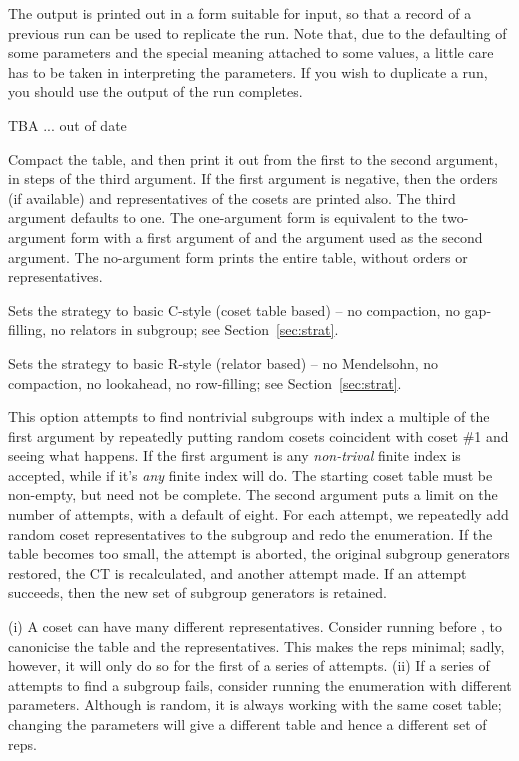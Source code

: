 The output is printed out in a form suitable for input, so that a record
  of a previous run can be used to replicate the run.
Note that, due to the defaulting of some parameters and the special
  meaning attached to some values, a little care has to be taken in
  interpreting the parameters.
If you wish to  duplicate a run, you should use the output
  of   the run completes.

\quad{}  TBA ... out of date

Compact the table, and then print it out from the first to the second
  argument, in steps of the third argument.
If the first argument is negative, then the orders (if available) and
  representatives of the cosets are printed also.
The third argument defaults to one.
The one-argument form is equivalent to the two-argument form with a first
  argument of  and the argument used as the second argument.
The no-argument form prints the entire table, without orders or
  representatives.

\quad{}

Sets the strategy to basic C-style (coset table based) -- 
  no compaction, no gap-filling, no relators in subgroup; 
  see Section~\ref{sec:strat}.

\quad{}

Sets the strategy to basic R-style (relator based) -- 
  no Mendelsohn, no compaction, no lookahead, no row-filling;
  see Section~\ref{sec:strat}.

\quad{}

This option attempts to find nontrivial subgroups with index a multiple
  of the first argument by repeatedly putting random cosets coincident
  with coset \#1 and seeing what happens.
If the first argument is  any \emph{non-trival} finite index is
  accepted, while if it's  \emph{any} finite index will do.
The starting coset table must be non-empty, but need not be complete.
The second argument puts a limit on the number of attempts, with a default
  of eight.
For each attempt, we repeatedly add random coset representatives to the 
  subgroup and redo the enumeration.
If the table becomes too small, the attempt is aborted, the original 
  subgroup generators restored, the CT is recalculated, and another attempt
  made.
If an attempt succeeds, then the new set of subgroup generators is
  retained.

(i)
A coset can have many different representatives.
Consider running  before , to canonicise the table and the
  representatives.
This makes the reps minimal; sadly, however, it will only do so for the
  first of a series of attempts.
(ii)
If a series of attempts to find a subgroup fails, consider running the
  enumeration with different parameters.
Although  is random, it is always working with the same coset
  table; changing the parameters will give a different table and hence
  a different set of reps.

